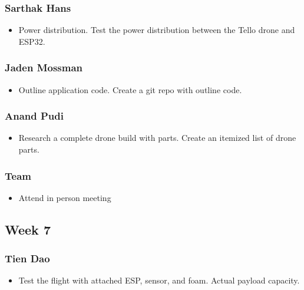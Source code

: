 \documentclass[12pt]{article}
\begin{document}
            \subsubsection*{Sarthak Hans}
                \begin{itemize}
                    \item Power distribution. Test the power distribution between the Tello drone and ESP32.
                \end{itemize}
            \subsubsection*{Jaden Mossman}
                \begin{itemize}
                    \item Outline application code. Create a git repo with outline code.
                \end{itemize}
            \subsubsection*{Anand Pudi}
                \begin{itemize}
                    \item Research a complete drone build with parts. Create an itemized list of drone parts.
                \end{itemize}
            \subsubsection*{Team}
                \begin{itemize}
                    \item Attend in person meeting
                \end{itemize}

        \subsection*{Week 7}
            \subsubsection*{Tien Dao}
                \begin{itemize}
                    \item Test the flight with attached ESP, sensor, and foam. Actual payload capacity.
                \end{itemize}
\end{document}
